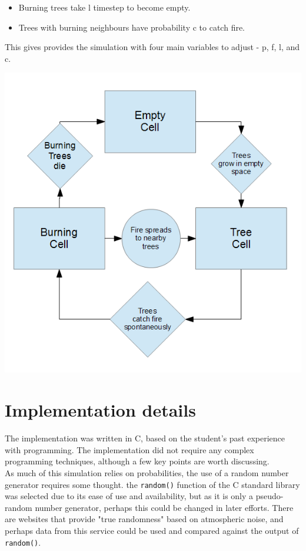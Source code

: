 \documentclass[11pt,a4paper]{report}
\begin{document}
\begin{itemize}
\item Burning trees take l timestep to become empty.
\item Trees with burning neighbours have probability c to catch fire.
\end{itemize}

This gives provides the simulation with four main variables to adjust - p, f,
l, and c.

\includegraphics{tex/flowchart}

\newpage
\section{Implementation details}

The implementation was written in C, based on the student's past
experience with programming. The implementation did not require any complex
programming techniques, although a few key points are worth discussing.\\

As much of this simulation relies on probabilities, the use of a random number
generator requires some thought. the \texttt{random()} function of the C
standard library was selected due to its ease of use and availability, but as
it is only a pseudo-random number generator, perhaps this could be changed in
later efforts. There are websites that provide "true randomness" based on
atmospheric noise\cite{random}, and perhaps data from this service could be
used and compared against the output of \texttt{random()}.\\
\end{document}

